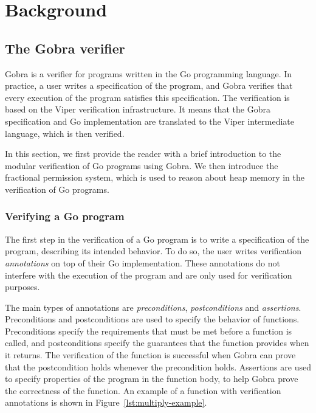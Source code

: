 \chapter{Background}


\section{The Gobra verifier}
\label{sec:the-gobra-verifier}

Gobra is a verifier for programs written in the Go programming language.
In practice, a user writes a specification of the program, and Gobra verifies that every execution of the program satisfies this specification.
The verification is based on the Viper verification infrastructure. It means that the Gobra specification and Go implementation are translated to the Viper intermediate language, which is then verified.

In this section, we first provide the reader with a brief introduction to the modular verification of Go programs using Gobra.
We then introduce the fractional permission system, which is used to reason about heap memory in the verification of Go programs.

\subsection{Verifying a Go program}
\label{sec:verifying-a-go-program}

The first step in the verification of a Go program is to write a specification of the program, describing its intended behavior.
To do so, the user writes verification \emph{annotations} on top of their Go implementation.
These annotations do not interfere with the execution of the program and are only used for verification purposes.

The main types of annotations are \emph{preconditions}, \emph{postconditions} and \emph{assertions}.
Preconditions and postconditions are used to specify the behavior of functions. Preconditions specify the requirements that must be met before a function is called, and postconditions specify the guarantees that the function provides when it returns.
The verification of the function is successful when Gobra can prove that the postcondition holds whenever the precondition holds.
Assertions are used to specify properties of the program in the function body, to help Gobra prove the correctness of the function.
An example of a function with verification annotations is shown in Figure~\ref{lst:multiply-example}.

